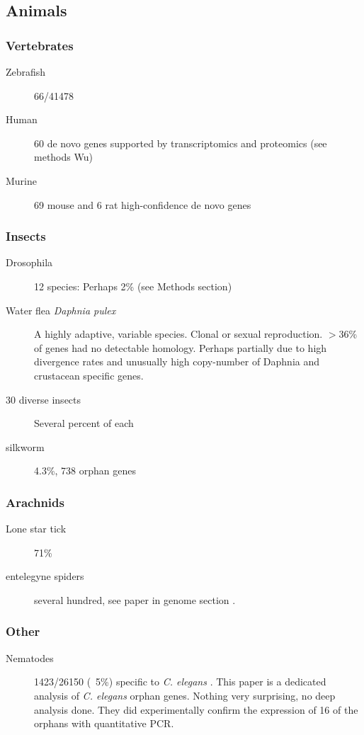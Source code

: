 \subsection{Animals}
  \subsubsection{Vertebrates}
  \begin{description}
    \item[Zebrafish] 66/41478 \cite{yang_genome-wide_2013}
    \item[Human] 60 de novo genes supported by transcriptomics and
      proteomics (see methods Wu) \cite{wu_novo_2011}
    \item[Murine] 69 mouse and 6 rat high-confidence de novo genes
      \cite{murphy_novo_2012}
  \end{description}

  \subsubsection{Insects}
  \begin{description}
    \item[Drosophila] 12 species: Perhaps 2\% (see Methods section)
      \cite{hahn_gene_2007}
    \item[Water flea \textit{Daphnia pulex}] A highly adaptive, variable
      species. Clonal or sexual reproduction. $>$36\% of genes had no
      detectable homology. Perhaps partially due to high divergence rates
      and unusually high copy-number of Daphnia and crustacean specific
      genes. \cite{colbourne_ecoresponsive_2011}
    \item[30 diverse insects] Several percent of each \cite{wissler_mechanisms_2013}
    \item[silkworm] 4.3\%, 738 orphan genes \cite{sun_identification_2015}
  \end{description}

  \subsubsection{Arachnids}
    \begin{description}
      \item[Lone star tick] 71\% \cite{gibson_why_2013}
      \item[entelegyne spiders] several hundred, see paper in genome section
        \cite{carlson_novo_2015}.
    \end{description}

  \subsubsection{Other}
  \begin{description}
    \item[Nematodes] 1423/26150 (~5\%) specific to \textit{C. elegans}
    \cite{zhou_genome-wide_2015}. This paper is a dedicated analysis of
    \textit{C. elegans} orphan genes. Nothing very surprising, no deep
    analysis done. They did experimentally confirm the expression of 16
    of the orphans with quantitative PCR.
  \end{description}
